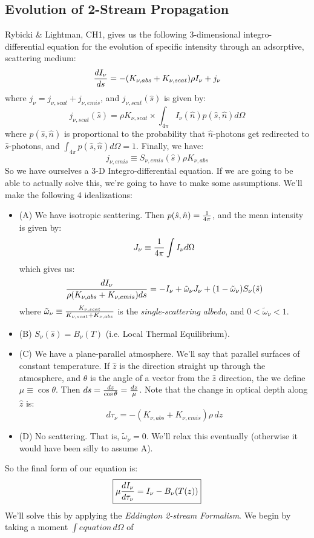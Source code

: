 \documentclass[11pt]{article}
\def\^{\hat}
\def\~{\tilde}
\def\inv#1{{1 \over #1}}
\begin{document}
\subsection*{ Evolution of 2-Stream Propagation}

Rybicki \& Lightman, CH1, gives us the following 3-dimensional 
integro-differential equation for the evolution of specific intensity through
an adsorptive, scattering medium:
\def\nabs{{\nu,abs}}
\def\nscat{{\nu,scat}}
\def\nemis{{\nu,emis}}
$${dI_\nu\over ds}=-(K_\nabs+K_\nscat)\rho I_\nu+j_\nu$$
where $j_\nu=j_\nscat+j_\nemis$, and $j_\nscat(\^s)$ is given by:
$$j_\nscat(\^s)=\rho K_\nscat\times\int_{4\pi}{I_\nu(\^n)p(\^s,\^n)d\Omega}$$
where $p(\^s,\^n)$ is proportional to the probability that $\^n$-photons get
redirected to $\^s$-photons, and $\int_{4\pi}{p(\^s,\^n)d\Omega}=1$.  Finally,
we have:
$$j_\nemis\equiv S_\nemis(\^s)\rho K_\nabs$$
So we have ourselves a 3-D Integro-differential equation.  If we are going to
be able to actually solve this, we're going to have to make some assumptions.
We'll make the following 4 idealizations:
\begin{itemize}
\item{(A)} We have isotropic scattering.  Then $p(\^s,\^n)=\inv{4\pi}$, and
the mean intensity is given by:
$$J_\nu\equiv\inv{4\pi}\int{I_\nu d\Omega}$$
which gives us:
$${dI_\nu\over\rho(K_\nabs+K_\nemis)ds}=-I_\nu+\~\omega_\nu J_\nu+(1-
\~\omega_\nu)S_\nu(\^s)$$
where $\~\omega_\nu\equiv{K_\nscat\over K_\nscat+K_\nabs}$ is the {\it
single-scattering albedo}, and $0<\~\omega_\nu<1$.
\item{(B)} $S_\nu(\^s)=B_\nu(T)$ (i.e. Local Thermal Equilibrium).
\item{(C)} We have a plane-parallel atmosphere.  We'll say that parallel
surfaces of constant temperature.  If $\^z$ is the direction straight up
through the atmosphere, and $\theta$ is the angle of a vector from the $\^z$
direction, the we define $\mu\equiv\cos\theta$.  Then $ds={dz\over\cos\theta}
={dz\over\mu}$.  Note that the change in optical depth along $\^z$ is:
$$d\tau_\nu=-(K_\nabs+K_\nemis)\rho\,dz$$
\item{(D)} No scattering.  That is, $\~\omega_\nu=0$.  We'll relax this
eventually (otherwise it would have been silly to assume A).  \par
\end{itemize}
So the final form of our equation is:
$$\boxed{\mu{dI_\nu\over d\tau_\nu}=I_\nu-B_\nu(T(z))}$$
We'll solve this by applying the {\it Eddington 2-stream Formalism}.
We begin by taking a moment $\int{equation\,d\Omega}$ of 
\end{document}
